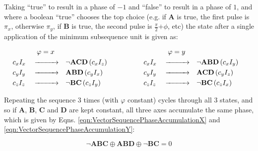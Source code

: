 \documentclass[PaulGanssle-Thesis.tex]{subfiles}
\begin{document}
Taking ``true'' to result in a phase of $-1$ and ``false'' to result in a phase of $1$, and where a boolean ``true'' chooses the top choice (e.g. if $\mathbf{A}$ is true, the first pulse is $\pi_{x}$, otherwise $\pi_{y}$, if $\mathbf{B}$ is true, the second pulse is $\tfrac{\pi}{2}{+\phi}$, etc) the state after a single application of the minimum subsequence unit is given as:

\begin{equation}
\label{eqn:VectorSequenceCycleLogicalUnits}
\begin{aligned}
&            && \specialcell{\hfill{}\varphi = x\hfill{}} &&                                         &\hspace*{15mm}&             && \specialcell{\hfill{}\varphi = y\hfill{}} &&                                           &\\
& c_{x}I_{x} && \xrightarrow{\hspace*{10mm}}              && \neg\mathbf{ACD}\left(c_{x}I_{z}\right) &              & c_{x}I_{x}  && \xrightarrow{\hspace*{10mm}}              &&  \neg\mathbf{ABD}\left(c_{x}I_{y}\right)  &\\
& c_{y}I_{y} && \xrightarrow{\hspace*{10mm}}              && \mathbf{ABD}\left(c_{y}I_{x}\right)     &              & c_{y}I_{y}  && \xrightarrow{\hspace*{10mm}}              &&  \mathbf{ACD}\left(c_{y}I_{z}\right)      &\\
& c_{z}I_{z} && \xrightarrow{\hspace*{10mm}}              && \neg\mathbf{BC}\left(c_{z}I_{y}\right)  &              & c_{z}I_{z}  && \xrightarrow{\hspace*{10mm}}              && \neg\mathbf{BC}\left(c_{z}I_{x}\right)    &
\end{aligned}
\end{equation}

Repeating the sequence 3 times (with $\varphi$ constant) cycles through all 3 states, and so if $\mathbf{A}$, $\mathbf{B}$, $\mathbf{C}$ and $\mathbf{D}$ are kept constant, all three axes accumulate the same phase, which is given by Eqns. \ref{eqn:VectorSequencePhaseAccumulationX} and \ref{eqn:VectorSequencePhaseAccumulationY}:

\begin{equation}
\label{eqn:VectorSequencePhaseAccumulationX}
\neg\mathbf{ABC}\oplus\mathbf{ABD}\oplus\neg\mathbf{BC} = 0
\end{equation}
\end{document}
